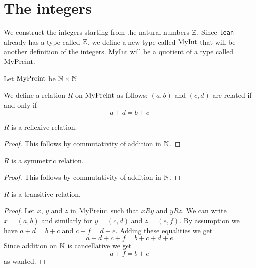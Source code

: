 \chapter{The integers}

We construct the integers starting from the natural numbers $\mathbb{Z}$. Since \texttt{lean} already has a
type called $\mathbb{Z}$, we define a new type called $\mathrm{MyInt}$ that will be another definition of the integers.
$\mathrm{MyInt}$ will be a quotient of a type called $\mathrm{MyPreint}$.

\begin{definition}
    \label{MyPreint}
    \leanok
    Let $\mathrm{MyPreint}$ be $\mathbb{N} \times \mathbb{N}$
\end{definition}

\begin{definition}
    \label{MyPreint.R}
    \leanok
We define a relation $R$ on $\mathrm{MyPreint}$ as follows: $(a,b)$ and $(c, d)$ are related if and only if
\[
a + d = b + c
\]
\end{definition}

\begin{lemma}
$R$ is a reflexive relation.
    \label{MyPreint.R_refl}
    \leanok
\end{lemma}
\begin{proof}
    \leanok
    This follows by commutativity of addition in $\mathbb{N}$.
\end{proof}

\begin{lemma}
$R$ is a symmetric relation.
    \label{MyPreint.R_symm}
    \leanok
\end{lemma}
\begin{proof}
    \leanok
    This follows by commutativity of addition in $\mathbb{N}$.
\end{proof}

\begin{lemma}
$R$ is a transitive relation.
    \label{MyPreint.R_trans}
    \leanok
\end{lemma}
\begin{proof}
    \leanok
    Let $x$, $y$ and $z$ in $\mathrm{MyPreint}$ such that $x R y$ and $y R z$. We can write $x = (a,b)$ and similarly
    for $y = (c,d)$ and $z = (e,f)$. By assumption we have $a+d=b+c$ and $c+f=d+e$. Adding these equalities we get
    \[
    a+d+c+f=b+c+d+e
    \]
    Since addition on $\mathbb{N}$ is cancellative we get
    \[
    a+f = b + e
    \]
    as wanted.
\end{proof}

